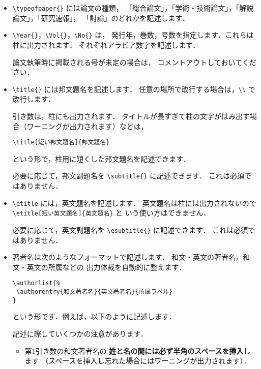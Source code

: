 \documentclass[paper]{jrsj}    %
\begin{document}
\begin{itemize}
\item
\verb/\typeofpaper{}/ には論文の種類，
「総合論文」，「学術・技術論文」，「解説論文」，「研究速報」，
「討論」のどれかを記述します．

\item
\verb/\Year{}/，\verb/\Vol{}/，\verb/\No{}/ は，
発行年，巻数，号数を指定します．これらは柱に出力されます．
それぞれアラビア数字を記述します．

論文執筆時に掲載される号が未定の場合は，
コメントアウトしておいてください．

\item
\verb/\title{}/ には邦文題名を記述します．
任意の場所で改行する場合は，\verb/\\/ で改行します．

引き数は，柱にも出力されます．
タイトルが長すぎて柱の文字がはみ出す場合（ワーニングが出力されます）などは，
\begin{verbatim}
\title[短い邦文題名]{邦文題名}
\end{verbatim}
という形で，柱用に短くした邦文題名を記述できます．

必要に応じて，邦文副題名を \verb/\subtitle{}/ に記述できます．
これは必須ではありません．

\item
\verb/\etitle/ には，英文題名を記述します．
英文題名は柱には出力されないので \verb/\etitle[短い英文題名]{英文題名}/ と
いう使い方はできません．

必要に応じて，英文副題名を \verb/\esubtitle{}/ に記述できます．
これは必須ではありません．

\item
著者名は次のようなフォーマットで記述します．
和文・英文の著者名，和文・英文の所属などの
出力体裁を自動的に整えます．
\begin{verbatim}
\authorlist{%
 \authorentry{和文著者名}{英文著者名}{所属ラベル}
}
\end{verbatim}
という形です．例えば，以下のように記述します．
\begin{verbatim*}
\end{verbatim*}
記述に際していくつかの注意があります．
 \begin{itemize}
 \item
 第1引き数の和文著者名の
 {\bfseries 姓と名の間には必ず半角のスペースを挿入}します
 （スペースを挿入し忘れた場合にはワーニングが出力されます）．


\end{itemize}
\end{itemize}
\end{document}
